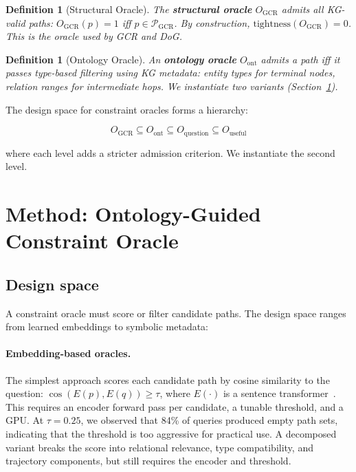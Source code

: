 \documentclass[11pt,twoside]{article}
\newtheorem{definition}[theorem]{Definition}
\begin{document}
\begin{definition}[Structural Oracle]
	The \textbf{structural oracle} \(O_{\text{GCR}}\) admits all KG-valid paths: \(O_{\text{GCR}}(p) = 1\) iff \(p \in \mathcal{P}_{\text{GCR}}\). By construction, \(\text{tightness}(O_{\text{GCR}}) = 0\). This is the oracle used by GCR and DoG.
\end{definition}

\begin{definition}[Ontology Oracle]
	An \textbf{ontology oracle} \(O_{\text{ont}}\) admits a path iff it passes type-based filtering using KG metadata: entity types for terminal nodes, relation ranges for intermediate hops. We instantiate two variants (Section~\ref{sec:method}).
\end{definition}

The design space for constraint oracles forms a hierarchy:

\[
	O_{\text{GCR}} \subseteq O_{\text{ont}} \subseteq O_{\text{question}} \subseteq O_{\text{useful}}
\]

where each level adds a stricter admission criterion. We instantiate the second level.

\section{Method: Ontology-Guided Constraint Oracle}
\label{sec:method}

\subsection{Design space}

A constraint oracle must score or filter candidate paths. The design space ranges from learned embeddings to symbolic metadata:

\paragraph{Embedding-based oracles.}
The simplest approach scores each candidate path by cosine similarity to the question: \(\cos(E(p), E(q)) \geq \tau\), where \(E(\cdot)\) is a sentence transformer~\citep{reimers2019sbert}. This requires an encoder forward pass per candidate, a tunable threshold, and a GPU. At \(\tau = 0.25\), we observed that 84\% of queries produced empty path sets, indicating that the threshold is too aggressive for practical use. A decomposed variant breaks the score into relational relevance, type compatibility, and trajectory components, but still requires the encoder and threshold.
\end{document}
